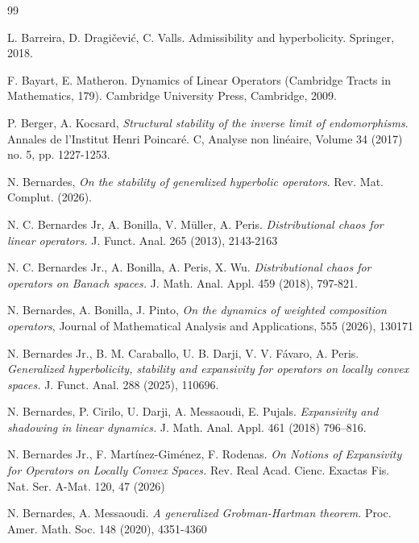 \documentclass[12pt]{article}
\theoremstyle{definition}
\begin{document}
\begin{thebibliography}{99}
{ 
L. Barreira, D. Dragičević, C. Valls. Admissibility and hyperbolicity. Springer, 2018.


F. Bayart, E. Matheron. Dynamics of Linear Operators (Cambridge Tracts in Mathematics, 179). Cambridge University Press, Cambridge, 2009.

P. Berger, A. Kocsard, \textit{Structural stability of the inverse limit of endomorphisms}. Annales de l'Institut Henri Poincaré. C, Analyse non linéaire, Volume 34 (2017) no. 5, pp. 1227-1253.


 N. Bernardes, \textit{On the stability of generalized hyperbolic operators}. Rev. Mat. Complut. (2026). 

N. C. Bernardes Jr, A. Bonilla, V. Müller, A. Peris.
\textit{Distributional chaos for linear operators.}
J. Funct. Anal. 265 (2013), 2143-2163

N. C. Bernardes Jr., A. Bonilla, A. Peris, X. Wu.
\textit{Distributional chaos for operators on Banach spaces.}
J. Math. Anal. Appl. 459 (2018), 797-821.

N. Bernardes, A. Bonilla, J. Pinto,
\textit{On the dynamics of weighted composition operators},
Journal of Mathematical Analysis and Applications,
555 (2026), 130171

N. Bernardes Jr., B. M. Caraballo, U. B. Darji, V. V. Fávaro, A. Peris. \textit{Generalized hyperbolicity, stability and expansivity for operators on locally convex spaces.} J. Funct. Anal. 288 (2025), 110696.

 N. Bernardes, P. Cirilo, U. Darji, A. Messaoudi, E. Pujals. \textit{Expansivity and shadowing in linear dynamics.} J. Math. Anal. Appl. 461 (2018) 796–816.

N. Bernardes Jr., F. Martínez-Giménez, F. Rodenas.
\textit{On Notions of Expansivity for Operators on Locally Convex Spaces.}
Rev. Real Acad. Cienc. Exactas Fis. Nat. Ser. A-Mat. 120, 47 (2026)

 N. Bernardes, A. Messaoudi. \textit{A generalized Grobman-Hartman theorem.} Proc. Amer. Math. Soc. 148 (2020), 4351-4360

}
\end{thebibliography}
\end{document}
